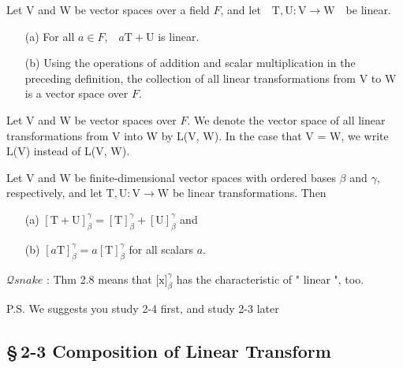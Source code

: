 \newpage

\begin{thm*}[2.7] $ $\\
	 Let V and W be vector spaces over a field $F$, and let\ \ $\mathrm{T} , \mathrm{U}: \mathrm{V} \rightarrow \mathrm{W}$\ \ be linear.
\begin{enumerate} 
	\item[(a)] For all $a \in F$,\ \ $a$$\mathrm{T} + \mathrm{U}$ is linear.
	\item[(b)] Using the operations of addition and scalar multiplication in the preceding definition, the collection of all linear transformations from V to W is a vector space over $F$.
\end{enumerate}
	
\end{thm*}

\begin{defn} $ $\\
Let V and W be vector spaces over $F$. We denote the vector space of all linear transformations from V into W by L(V, W). In the case that V = W, we write L(V) instead of L(V, W).
\end{defn}


\begin{thm*}[2.8]$ $\\
	Let V and W be finite-dimensional vector spaces with ordered bases $\beta$ and $\gamma$, respectively, and let $\mathrm{T} , \mathrm{U}: \mathrm{V} \rightarrow \mathrm{W}$ be linear transformations. Then
\begin{enumerate}
	\item[(a)] $[\mathrm{T} + \mathrm{U}]^\gamma_\beta = [\mathrm{T}]^\gamma_\beta + [\mathrm{U}]^\gamma_\beta$ and
	\item[(b)] $[a\mathrm{T}]^\gamma_\beta = a[\mathrm{T}]^\gamma_\beta$ for all scalars $a$.
\end{enumerate}
$\mathcal{Q} snake$ : Thm 2.8 means that $\lbrack \mathrm{x} \rbrack^\gamma_\beta$ has the characteristic of " linear ", too.
\end{thm*}

\newpage

\color{red} P.S. We suggests you study 2-4 first, and study 2-3 later 

\subsection*{\color{black}\S\,2-3 Composition of Linear Transform}

